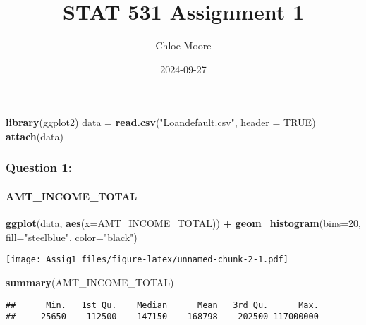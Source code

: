 \documentclass[
]{article}
\title{STAT 531 Assignment 1}
\author{Chloe Moore}
\date{2024-09-27}
\newenvironment{Shaded}{\begin{snugshade}}{\end{snugshade}}
\newcommand{\AttributeTok}[1]{\textcolor[rgb]{0.13,0.29,0.53}{#1}}
\newcommand{\ConstantTok}[1]{\textcolor[rgb]{0.56,0.35,0.01}{#1}}
\newcommand{\DecValTok}[1]{\textcolor[rgb]{0.00,0.00,0.81}{#1}}
\newcommand{\FunctionTok}[1]{\textcolor[rgb]{0.13,0.29,0.53}{\textbf{#1}}}
\newcommand{\NormalTok}[1]{#1}
\newcommand{\OtherTok}[1]{\textcolor[rgb]{0.56,0.35,0.01}{#1}}
\newcommand{\SpecialCharTok}[1]{\textcolor[rgb]{0.81,0.36,0.00}{\textbf{#1}}}
\newcommand{\StringTok}[1]{\textcolor[rgb]{0.31,0.60,0.02}{#1}}
\begin{document}
\maketitle

\begin{Shaded}
\begin{Highlighting}[]
\FunctionTok{library}\NormalTok{(ggplot2)}
\NormalTok{data }\OtherTok{=} \FunctionTok{read.csv}\NormalTok{(}\StringTok{"Loandefault.csv"}\NormalTok{, }\AttributeTok{header =} \ConstantTok{TRUE}\NormalTok{)}
\FunctionTok{attach}\NormalTok{(data)}
\end{Highlighting}
\end{Shaded}

\hypertarget{question-1}{%
\subsubsection{Question 1:}\label{question-1}}

\hypertarget{amt_income_total}{%
\paragraph{AMT\_INCOME\_TOTAL}\label{amt_income_total}}

\begin{Shaded}
\begin{Highlighting}[]
\FunctionTok{ggplot}\NormalTok{(data, }\FunctionTok{aes}\NormalTok{(}\AttributeTok{x=}\NormalTok{AMT\_INCOME\_TOTAL)) }\SpecialCharTok{+}
  \FunctionTok{geom\_histogram}\NormalTok{(}\AttributeTok{bins=}\DecValTok{20}\NormalTok{, }\AttributeTok{fill=}\StringTok{"steelblue"}\NormalTok{, }\AttributeTok{color=}\StringTok{"black"}\NormalTok{)}
\end{Highlighting}
\end{Shaded}

\texttt{[image: Assig1\_files/figure-latex/unnamed-chunk-2-1.pdf]}

\begin{Shaded}
\begin{Highlighting}[]
\FunctionTok{summary}\NormalTok{(AMT\_INCOME\_TOTAL)}
\end{Highlighting}
\end{Shaded}

\begin{verbatim}
##      Min.   1st Qu.    Median      Mean   3rd Qu.      Max. 
##     25650    112500    147150    168798    202500 117000000
\end{verbatim}
\end{document}
